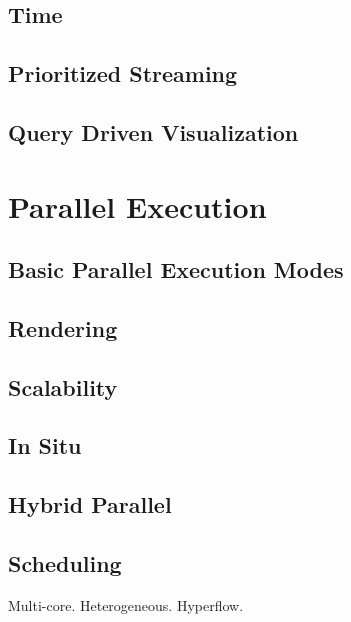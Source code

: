 \documentclass[twocolumn,10pt]{article}
\begin{document}
\subsection{Time}
\label{sec:Time}

\subsection{Prioritized Streaming}
\label{sec:PrioritizedStreaming}

\subsection{Query Driven Visualization}
\label{sec:QueryDrivenVisualization}


\section{Parallel Execution}
\label{sec:ParallelExecution}

\subsection{Basic Parallel Execution Modes}
\label{sec:ParallelExecution:Modes}

\subsection{Rendering}
\label{sec:ParallelExecution:Rendering}

\subsection{Scalability}
\label{sec:Scalability}

\subsection{In Situ}
\label{sec:InSitu}

\subsection{Hybrid Parallel}
\label{sec:HybridParallel}

\subsection{Scheduling}
\label{sec:Scheduling}

Multi-core.  Heterogeneous.  Hyperflow.
\end{document}
